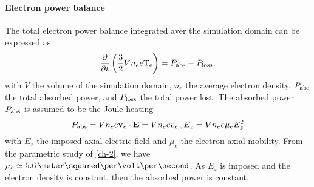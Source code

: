     
    \paragraph{Electron power balance\\}
    The total electron power balance integrated aver the simulation domain can be expressed as
    \begin{equation} \label{eq-GMel}
      \frac{\partial }{\partial t} \left( \frac{3}{2} V n_e e \mathrm{T_e} \right) = P_{\rm abs} - P_{\rm loss},
    \end{equation}
    with $V$ the  volume of the simulation domain, $n_e$ the average electron density,  $P_{\rm abs}$ the total absorbed power, and $P_{\rm loss}$ the total power lost.
    The absorbed power $P_{\rm abs}$ is assumed to be the Joule heating
    \begin{equation} \label{eq-pabs}
      P_{\rm abs} = V n_e e {\mathbf v_e} \cdot {\mathbf E} = V n_e e v_{e, z} E_z = V n_e e \mu_e  E_z^2
    \end{equation}
    with $E_z$ the imposed axial electric field and $\mu_e$ the electron axial mobility.
    From the parametric study of \cref{ch-2}, we have $\mu_e \simeq 5.6 \,\meter\squared\per\volt\per\second$.
    As $E_z$ is imposed and the electron density is constant, then the absorbed power is constant.
    
